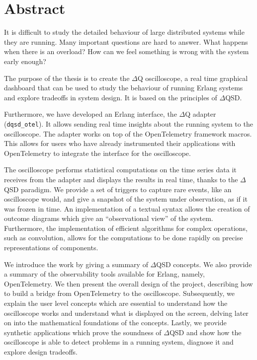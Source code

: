 \chapter*{Abstract}
    It is difficult to study the detailed behaviour of large distributed systems while they are running. Many important questions are hard to answer. What happens when there is an overload? How can we feel something is wrong with the system early enough?

    The purpose of the thesis is to create the $\Delta$Q oscilloscope, a real time graphical dashboard that can be used to study the behaviour of running Erlang systems and explore tradeoffs in system design. It is based on the principles of $\Delta$QSD.
  
    Furthermore, we have developed an Erlang interface, the $\Delta$Q adapter (\texttt{dqsd\_otel}). It allows sending real time insights about the running system to the oscilloscope. The adapter works on top of the OpenTelemetry framework macros. This allows for users who have already instrumented their applications with OpenTelemetry to integrate the interface for the oscilloscope.
    
    The oscilloscope performs statistical computations on the time series data it receives from the adapter and displays the results in real time, thanks to the $\Delta$QSD paradigm. We provide a set of triggers to capture rare events, like an oscilloscope would, and give a snapshot of the system under observation, as if it was frozen in time. An implementation of a textual syntax allows the creation of outcome diagrams which give an ``observational view'' of the system. Furthermore, the implementation of efficient algorithms for complex operations, such as convolution, allows for the computations to be done rapidly on precise representations of components.

    We introduce the work by giving a summary of $\Delta$QSD concepts. We also provide a summary of the observability tools available for Erlang, namely, OpenTelemetry. We then present the overall design of the project, describing how to build a bridge from OpenTelemetry to the oscilloscope. Subsequently, we explain the user level concepts which are essential to understand how the oscilloscope works and understand what is displayed on the screen, delving later on into the mathematical foundations of the concepts. Lastly, we provide synthetic applications which prove the soundness of $\Delta$QSD and show how the oscilloscope is able to detect problems in a running system, diagnose it and explore design tradeoffs.



